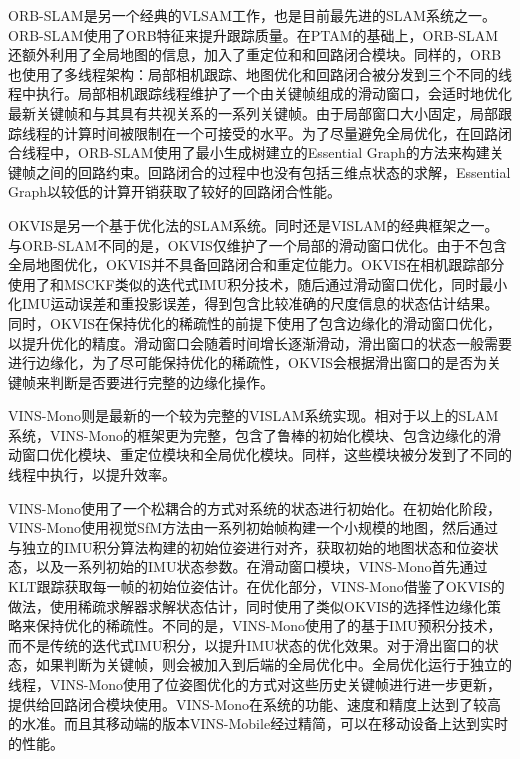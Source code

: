 ORB-SLAM\citep{mur2015orb,murorb2}是另一个经典的VLSAM工作，也是目前最先进的SLAM系统之一。ORB-SLAM使用了ORB特征来提升跟踪质量。在PTAM的基础上，ORB-SLAM还额外利用了全局地图的信息，加入了重定位和和回路闭合模块。同样的，ORB也使用了多线程架构：局部相机跟踪、地图优化和回路闭合被分发到三个不同的线程中执行。局部相机跟踪线程维护了一个由关键帧组成的滑动窗口，会适时地优化最新关键帧和与其具有共视关系的一系列关键帧。由于局部窗口大小固定，局部跟踪线程的计算时间被限制在一个可接受的水平。为了尽量避免全局优化，在回路闭合线程中，ORB-SLAM使用了最小生成树建立的Essential Graph的方法来构建关键帧之间的回路约束。回路闭合的过程中也没有包括三维点状态的求解，Essential Graph以较低的计算开销获取了较好的回路闭合性能。

OKVIS\citep{leutenegger2015keyframe}是另一个基于优化法的SLAM系统。同时还是VISLAM的经典框架之一。与ORB-SLAM不同的是，OKVIS仅维护了一个局部的滑动窗口优化。由于不包含全局地图优化，OKVIS并不具备回路闭合和重定位能力。OKVIS在相机跟踪部分使用了和MSCKF类似的迭代式IMU积分技术，随后通过滑动窗口优化，同时最小化IMU运动误差和重投影误差，得到包含比较准确的尺度信息的状态估计结果。同时，OKVIS在保持优化的稀疏性的前提下使用了包含边缘化的滑动窗口优化，以提升优化的精度。滑动窗口会随着时间增长逐渐滑动，滑出窗口的状态一般需要进行边缘化，为了尽可能保持优化的稀疏性，OKVIS会根据滑出窗口的是否为关键帧来判断是否要进行完整的边缘化操作。

VINS-Mono\citep{qin2018vins}则是最新的一个较为完整的VISLAM系统实现。相对于以上的SLAM系统，VINS-Mono的框架更为完整，包含了鲁棒的初始化模块、包含边缘化的滑动窗口优化模块、重定位模块和全局优化模块。同样，这些模块被分发到了不同的线程中执行，以提升效率。

VINS-Mono使用了一个松耦合的方式对系统的状态进行初始化。在初始化阶段，VINS-Mono使用视觉SfM方法由一系列初始帧构建一个小规模的地图，然后通过与独立的IMU积分算法构建的初始位姿进行对齐，获取初始的地图状态和位姿状态，以及一系列初始的IMU状态参数。在滑动窗口模块，VINS-Mono首先通过KLT跟踪获取每一帧的初始位姿估计。在优化部分，VINS-Mono借鉴了OKVIS的做法，使用稀疏求解器求解状态估计，同时使用了类似OKVIS的选择性边缘化策略来保持优化的稀疏性。不同的是，VINS-Mono使用了的基于IMU预积分\citep{davison2007monoslam}技术，而不是传统的迭代式IMU积分，以提升IMU状态的优化效果。对于滑出窗口的状态，如果判断为关键帧，则会被加入到后端的全局优化中。全局优化运行于独立的线程，VINS-Mono使用了位姿图优化的方式对这些历史关键帧进行进一步更新，提供给回路闭合模块使用。VINS-Mono在系统的功能、速度和精度上达到了较高的水准。而且其移动端的版本VINS-Mobile\citep{li2017monocular}经过精简，可以在移动设备上达到实时的性能。

